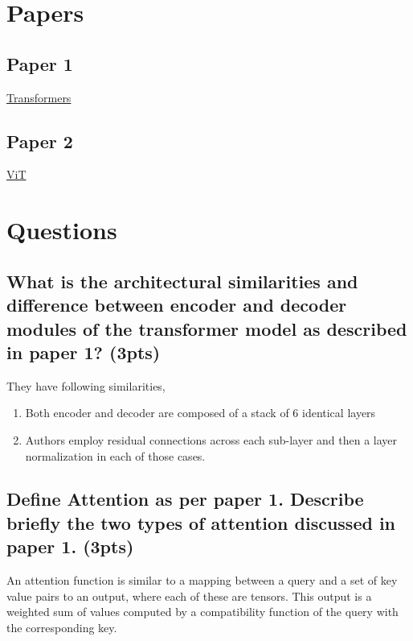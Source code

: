 \documentclass{article}
\title{\mathbf{Discussion Quiz \#7}}
\author{{Ashutosh Tiwari (ashutiwa@iu.edu)}}
\begin{document}
\maketitle

\section{Papers}
\subsection{Paper 1}
    \href{https://arxiv.org/pdf/1706.03762.pdf}{Transformers}
\subsection{Paper 2}
    \href{https://arxiv.org/pdf/2010.11929.pdf}{ViT}

\section{Questions}

\subsection{What is the architectural similarities and difference between encoder and decoder modules of the transformer model as described in paper 1? (3pts)}

They have following similarities,

\begin{enumerate}
    \item Both encoder and decoder are composed of a stack of 6 identical layers
    \item Authors employ residual connections across each sub-layer and then a layer normalization in each of those cases.
\end{enumerate}

\subsection{Define Attention as per paper 1. Describe briefly the two types of attention discussed in paper 1. (3pts)}

An attention function is similar to a mapping between a query and a set of key value pairs to an output, where each of these are tensors. This output is a weighted sum of values computed by a compatibility function of the query with the corresponding key.
\end{document}
